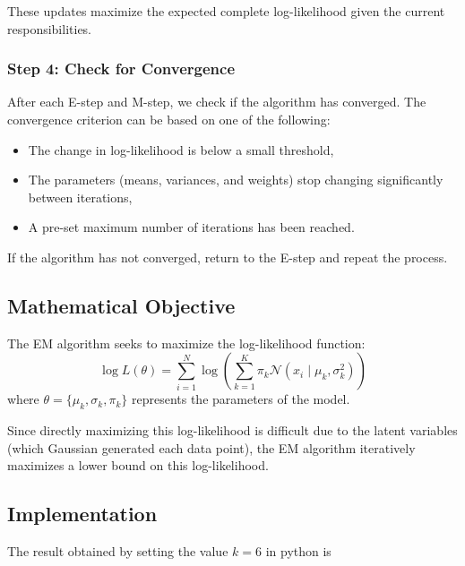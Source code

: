 \documentclass[openany]{book}
\begin{document}
        These updates maximize the expected complete log-likelihood given the current responsibilities.
        
        \subsubsection*{Step 4: Check for Convergence}
        
        After each E-step and M-step, we check if the algorithm has converged. The convergence criterion can be based on one of the following:
        
        \begin{itemize}
            \item The change in log-likelihood is below a small threshold,
            \item The parameters (means, variances, and weights) stop changing significantly between iterations,
            \item A pre-set maximum number of iterations has been reached.
        \end{itemize}
        
        If the algorithm has not converged, return to the E-step and repeat the process.
        
        \subsection*{Mathematical Objective}
        
        The EM algorithm seeks to maximize the log-likelihood function:
        \[
        \log L(\theta) = \sum_{i=1}^{N} \log \left( \sum_{k=1}^{K} \pi_k \mathcal{N}(x_i \mid \mu_k, \sigma^2_k) \right)
        \]
        where \( \theta = \{\mu_k, \sigma_k, \pi_k \} \) represents the parameters of the model.
        
        Since directly maximizing this log-likelihood is difficult due to the latent variables (which Gaussian generated each data point), the EM algorithm iteratively maximizes a lower bound on this log-likelihood.
        
        \subsection*{Implementation}
        The result obtained by setting the value $k = 6$ in python is 
        
\end{document}
